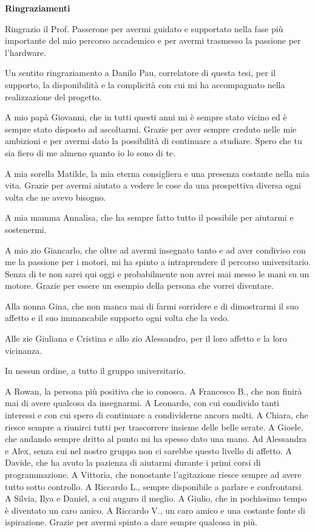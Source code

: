 \thispagestyle{empty}

\begin{center}
  {\bf \Huge Ringraziamenti}
\end{center}

\vspace{4cm}


Ringrazio il Prof. Passerone per avermi guidato e supportato nella fase più importante del mio percorso accademico e per avermi trasmesso la passione per l'hardware.

Un sentito ringraziamento a Danilo Pau, correlatore di questa tesi, per il supporto, la disponibilità e la complicità con cui mi ha accompagnato nella realizzazione del progetto.

A mio papà Giovanni, che in tutti questi anni mi è sempre stato vicino ed è sempre stato disposto ad ascoltarmi. Grazie per aver sempre creduto nelle mie ambizioni e per avermi dato la possibilità di continuare a studiare. Spero che tu sia fiero di me almeno quanto io lo sono di te.

A mia sorella Matilde, la mia eterna consigliera e una presenza costante nella mia vita. Grazie per avermi aiutato a vedere le cose da una prospettiva diversa ogni volta che ne avevo bisogno.

A mia mamma Annalisa, che ha sempre fatto tutto il possibile per aiutarmi e sostenermi.

A mio zio Giancarlo, che oltre ad avermi insegnato tanto e ad aver condiviso con me la passione per i motori, mi ha spinto a intraprendere il percorso universitario. Senza di te non sarei qui oggi e probabilmente non avrei mai messo le mani su un motore. Grazie per essere un esempio della persona che vorrei diventare.

Alla nonna Gina, che non manca mai di farmi sorridere e di dimostrarmi il suo affetto e il suo immancabile supporto ogni volta che la vedo.

Alle zie Giuliana e Cristina e allo zio Alessandro, per il loro affetto e la loro vicinanza.

In nessun ordine, a tutto il gruppo universitario.

A Rowan, la persona più positiva che io conosca. A Francesco B., che non finirà mai di avere qualcosa da insegnarmi. A Leonardo, con cui condivido tanti interessi e con cui spero di continuare a condividerne ancora molti. A Chiara, che riesce sempre a riunirci tutti per trascorrere insieme delle belle serate. A Gioele, che andando sempre dritto al punto mi ha spesso dato una mano. Ad Alessandra e Alex, senza cui nel nostro gruppo non ci sarebbe questo livello di affetto. A Davide, che ha avuto la pazienza di aiutarmi durante i primi corsi di programmazione. A Vittoria, che nonostante l'agitazione riesce sempre ad avere tutto sotto controllo. A Riccardo L., sempre disponibile a parlare e confrontarsi. A Silvia, Ilya e Daniel, a cui auguro il meglio. A Giulio, che in pochissimo tempo è diventato un caro amico.
A Riccardo V., un caro amico e una costante fonte di ispirazione. Grazie per avermi spinto a dare sempre qualcosa in più.

